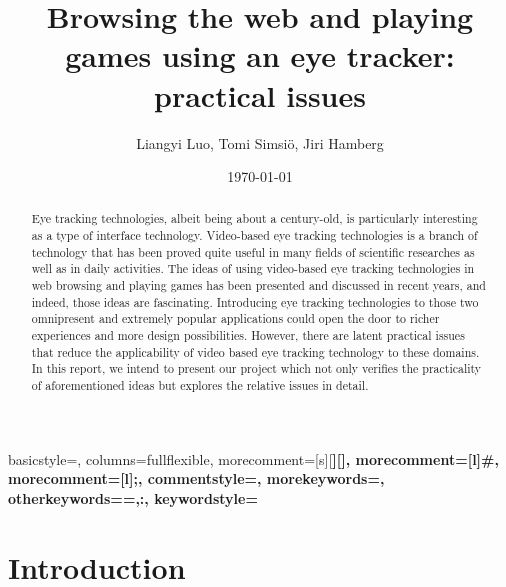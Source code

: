 \documentclass[english]{tktltiki}
\begin{document}
\onehalfspacing

{
    basicstyle=\ttfamily\small\singlespacing,
    columns=fullflexible,
    morecomment=[s][\color{Orchid}\bfseries]{[}{]},
    morecomment=[l]{\#},
    morecomment=[l]{;},
    commentstyle=\color{gray}\ttfamily,
    morekeywords={},
    otherkeywords={=,:},
    keywordstyle={\color{red}\bfseries}
}

\title{Browsing the web and playing games using an eye tracker: practical issues}
\author{Liangyi Luo, Tomi Simsiö, Jiri Hamberg }
\date{\today}

\maketitle


\keywords{ }

\begin{abstract}

Eye tracking technologies, albeit being about a century-old, is particularly interesting as a type of interface technology. Video-based eye tracking technologies is a branch of technology that has been proved quite useful in many fields of scientific researches as well as in daily activities. The ideas of using video-based eye tracking technologies in web browsing and playing games has been presented and discussed in recent years, and indeed, those ideas are fascinating. Introducing eye tracking technologies to those two omnipresent and extremely popular applications could open the door to richer experiences and more design possibilities. However, there are latent practical issues that reduce the applicability of video based eye tracking technology to these domains. In this report, we intend to present our project which not only verifies the practicality of aforementioned ideas but explores the relative issues in detail.   


\end{abstract}

\mytableofcontents




\section{Introduction}
\end{document}
